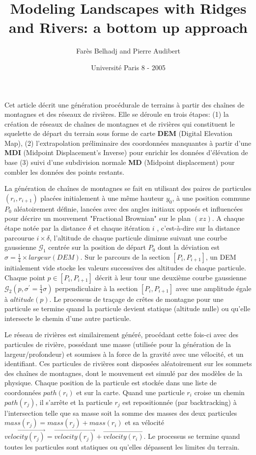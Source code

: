 \documentclass[11pt]{article}
\title{Modeling Landscapes with Ridges and Rivers: a bottom up approach}
\author{Farès Belhadj and Pierre Audibert}
\date{Université Paris 8 - 2005}
\begin{document}
\maketitle

Cet article décrit une génération procédurale de terrains à partir des chaînes de montagnes et des réseaux de rivières. Elle se déroule en trois étapes: (1) la création de réseaux de chaînes de montagnes et de rivières qui constituent le squelette de départ du terrain sous forme de carte \textbf{DEM} (Digital Elevation Map), (2) l'extrapolation préliminaire des coordonnées manquantes à partir d'une \textbf{MDI} (Midpoint Displacement's Inverse) pour enrichir les données d'élévation de base (3) suivi d'une subdivision normale \textbf{MD} (Midpoint displacement) pour combler les données des points restants.

La génération de chaînes de montagnes se fait en utilisant des paires de particules $(r_i, r_{i+1})$ placées initialement à une même hauteur $y_0$, à une position commune $P_{0}$ aléatoirement définie, lancées avec des angles initiaux opposés et influencées pour décrire un mouvement "Fractional Brownian" sur le plan $(xz)$. A chaque étape notée par la distance $\delta$ et chaque itération $i$ , c'est-à-dire sur la distance parcourue $i \times \delta$, l'altitude de chaque particule diminue suivant une courbe gaussienne $\mathcal{G}_1$ centrée sur la position de départ $P_{0}$ dont la déviation est $\sigma = \frac{1}{4} \times largeur(DEM)$. Sur le parcours de la section $[P_i, P_{i+1}]$, un DEM initialement vide stocke les valeurs successives des altitudes de chaque particule. Chaque point $p \in [P_i, P_{i+1}]$  décrit à leur tour une deuxième courbe gaussienne $\mathcal{G}_2(p, \sigma^{\prime} = \frac{1}{4}\sigma)$ perpendiculaire à la section $[P_i, P_{i+1}]$ avec une amplitude égale à $altitude(p)$. Le processus de traçage de crêtes de montagne pour une particule se termine quand la particule devient statique (altitude nulle) ou qu'elle intersecte le chemin d'une autre particule.

Le réseau de rivières est similairement généré, procédant cette fois-ci avec des particules de rivière, possédant une masse (utilisée pour la génération de la largeur/profondeur) et soumises à la force de la gravité avec une vélocité, et un identifiant. Ces particules de rivières sont disposées aléatoirement sur les sommets des chaînes de montagnes, dont le mouvement est simulé par des modèles de la physique. Chaque position de la particule est stockée dans une liste de coordonnées $path(r_i)$ et sur la carte. Quand une particule $r_i$ croise un chemin $path(r_j)$, il s'arrête et la particule $r_j$ est repositionnée (par backtracking) à l'intersection telle que sa masse soit la somme des masses des deux particules $mass(r_j) = mass(r_j) + mass(r_i)$ et sa vélocité $\overrightarrow{velocity(r_j)} = \overrightarrow{velocity(r_j)} + \overrightarrow{velocity(r_i)}$. Le processus se termine quand toutes les particules sont statiques ou qu'elles dépassent les limites du terrain.
\end{document}
